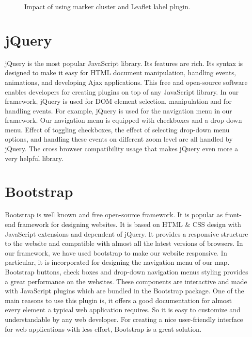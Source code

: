 \begin{figure}[H]
  \begin{center}
\hfill
{}
\hfill
\caption{Impact of using marker cluster and Leaflet label plugin.}
\end{center}
\end{figure}

\section*{jQuery}

jQuery is the most popular JavaScript library. Its features are rich. Its syntax is designed to make it easy for HTML document manipulation, handling events, animations, and developing Ajax applications. This free and open-source software enables developers for creating plugins on top of any JavaScript library. In our framework, jQuery is used for DOM element selection, manipulation and for handling events. For example, jQuery is used for the navigation menu in our framework. Our navigation menu is equipped with checkboxes and a drop-down menu. Effect of toggling checkboxes, the effect of selecting drop-down menu options, and handling these events on different zoom level are all handled by jQuery. The cross browser compatibility usage that makes jQuery even more a very helpful library. 

\section*{Bootstrap}

Bootstrap is well known and free open-source framework. It is popular as front-end framework for designing websites. It is based on HTML \& CSS design with JavaScript extensions and dependent of jQuery. It provides a responsive structure to the website and compatible with almost all the latest versions of browsers. In our framework, we have used bootstrap to make our website responsive. In particular, it is incorporated for designing the navigation menu of our map.
Bootstrap buttons, check boxes and drop-down navigation menus styling provides a great performance on the websites. These components are interactive and made with JavaScript plugins which are bundled in the Bootstrap package. One of the main reasons to use this plugin is, it offers a good documentation for almost every element a typical web application requires. So it is easy to customize and understandable by any web developer. For creating a nice user-friendly interface for web applications with less effort, Bootstrap is a great solution.

